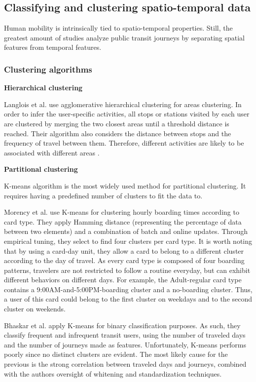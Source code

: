\documentclass{article}
\begin{document}
\subsection{Classifying and clustering spatio-temporal data}
Human mobility is intrinsically tied to spatio-temporal properties. Still, the greatest amount of studies analyze public transit journeys by separating spatial features from temporal features.


\subsubsection{Clustering algorithms} 

\textbf{Hierarchical clustering}

Langlois et al. use agglomerative hierarchical clustering for areas clustering. In order to infer the user-specific activities, all stops or stations visited by each user are clustered by merging the two closest areas until a threshold distance is reached. Their algorithm also considers the distance between stops and the frequency of travel between them. Therefore, different activities are likely to be associated with different areas \cite{langlois2016inferring}.

\textbf{Partitional clustering}

K-means algorithm is the most widely used method for partitional clustering. It requires having a predefined number of clusters to fit the data to. 

Morency et al. use K-means for clustering hourly boarding times according to card type. They apply Hamming distance (representing the percentage of data between two elements) and a combination of batch and online updates. Through empirical tuning, they select to find four clusters per card type. It is worth noting that by using a card-day unit, they allow a card to belong to a different cluster according to the day of travel. As every card type is composed of four boarding patterns, travelers are not restricted to follow a routine everyday, but can exhibit different behaviors on different days. For example, the Adult-regular card type contains a 9:00AM-and-5:00PM-boarding cluster and a no-boarding cluster. Thus, a user of this card could belong to the first cluster on weekdays and to the second cluster on weekends.  \cite{morency2007measuring}

Bhaskar et al. apply K-means for binary classification purposes. As such, they classify frequent and infrequent transit users, using the number of traveled days and the number of journeys made as features. Unfortunately, K-means performs poorly since no distinct clusters are evident. The most likely cause for the previous is the strong correlation between traveled days and journeys, combined with the authors oversight of whitening and standardization techniques. \cite{bhaskar2015passenger}
\end{document}
